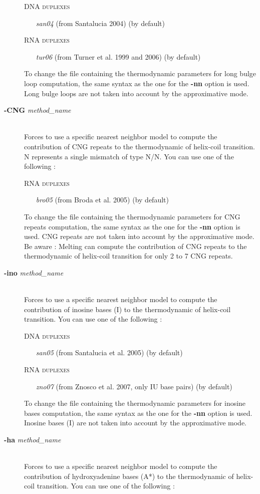 \documentclass{article}
\begin{document}
\begin{description}
  \textsc{DNA duplexes}
    \begin{itemize}
    \item [\textit{san04}] (from Santalucia 2004) (by default)
    \end{itemize}
  \textsc{RNA duplexes}
    \begin{itemize}
    \item [\textit{tur06}] (from Turner et al. 1999 and 2006)  (by default) 			 			 
    \end{itemize}
  To change the file containing the thermodynamic parameters for long bulge loop computation, the same syntax as the one for the \textbf{-nn} option is used.
  Long bulge loops are not taken into account by the approximative mode.
\item [\textbf{-CNG} \textit{method\_name}]\mbox{}\\ 
  Forces to use a specific nearest neighbor model to compute the contribution of CNG repeats to the thermodynamic of helix-coil transition.
  N represents a single mismatch of type N/N. 
  You can use one of the following :
  
  \textsc{RNA duplexes}
    \begin{itemize}
    \item [\textit{bro05}] (from Broda et al. 2005) (by default)			 			 
    \end{itemize}
  To change the file containing the thermodynamic parameters for CNG repeats computation, the same syntax as the one for the \textbf{-nn} option is used.
  CNG repeats are not taken into account by the approximative mode. 
  Be aware : Melting can compute the contribution of CNG repeats to the thermodynamic of helix-coil transition for only 2 to 7 CNG repeats.
\item [\textbf{-ino} \textit{method\_name}]\mbox{}\\ 
  Forces to use a specific nearest neighbor model to compute the contribution of inosine bases (I) to the thermodynamic of helix-coil transition. 
  You can use one of the following :
  
  \textsc{DNA duplexes}
    \begin{itemize}
    \item [\textit{san05}] (from Santalucia et al. 2005)  (by default)
    \end{itemize}
  \textsc{RNA duplexes}
    \begin{itemize}
    \item [\textit{zno07}] (from Znosco et al. 2007, only IU base pairs)  (by default)  			 			 
    \end{itemize}
  To change the file containing the thermodynamic parameters for inosine bases computation, the same syntax as the one for the \textbf{-nn} option is used.
  Inosine bases (I) are not taken into account by the approximative mode. 
\item [\textbf{-ha} \textit{method\_name}]\mbox{}\\ 
  Forces to use a specific nearest neighbor model to compute the contribution of hydroxyadenine bases (A*) to the thermodynamic of helix-coil transition. 
  You can use one of the following :
  

\end{description}
\end{document}
